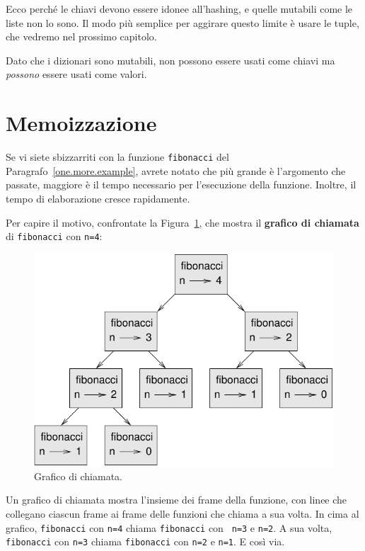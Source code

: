 \documentclass[10pt]{book}
\begin{document}
Ecco perché le chiavi devono essere idonee all'hashing, e quelle mutabili come le liste non lo sono. Il modo più semplice per aggirare questo limite è usare le tuple, che vedremo nel prossimo capitolo.

Dato che i dizionari sono mutabili, non possono essere usati come chiavi ma {\em possono} essere usati come valori.


\section{Memoizzazione}
\label{memoize}

Se vi siete sbizzarriti con la funzione {\tt fibonacci} del Paragrafo~\ref{one.more.example}, avrete notato che più grande è l'argomento che passate, maggiore è il tempo necessario per l'esecuzione della funzione. Inoltre, il tempo di elaborazione cresce rapidamente.

Per capire il motivo, confrontate la Figura~\ref{fig.fibonacci}, che mostra il {\bf grafico di chiamata} di {\tt fibonacci} con {\tt n=4}:

\begin{figure}
\centerline
{\includegraphics[scale=0.7]{figs/fibonacci.pdf}}
\caption{Grafico di chiamata.}
\label{fig.fibonacci}
\end{figure}

Un grafico di chiamata mostra l'insieme dei frame della funzione, con linee che collegano ciascun frame ai frame delle funzioni che chiama a sua volta. In cima al grafico, {\tt fibonacci} con {\tt n=4} chiama {\tt fibonacci} con {\tt
n=3} e {\tt n=2}.  A sua volta, {\tt fibonacci} con {\tt n=3} chiama
{\tt fibonacci} con {\tt n=2} e {\tt n=1}.  E così via.
\end{document}
